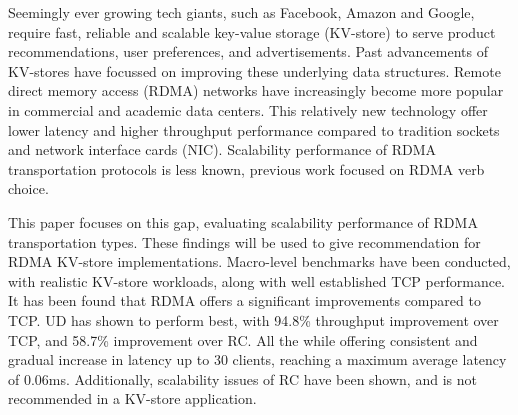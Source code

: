 


\begin{abstracts}        %

    Seemingly ever growing tech giants, such as Facebook, Amazon and Google, require fast, reliable and scalable key-value storage (KV-store) to serve product recommendations, user preferences, and advertisements.
    Past advancements of KV-stores have focussed on improving these underlying data structures.
    Remote direct memory access (RDMA) networks have increasingly become more popular in commercial and academic data centers.
    This relatively new technology offer lower latency and higher throughput performance compared to tradition sockets and network interface cards (NIC).
    Scalability performance of RDMA transportation protocols is less known, previous work focused on RDMA verb choice.

    This paper focuses on this gap, evaluating scalability performance of RDMA transportation types.
    These findings will be used to give recommendation for RDMA KV-store implementations.
    Macro-level benchmarks have been conducted, with realistic KV-store workloads, along with well established TCP performance.
    It has been found that RDMA offers a significant improvements compared to TCP.
    UD has shown to perform best, with 94.8\% throughput improvement over TCP, and 58.7\% improvement over RC.
    All the while offering consistent and gradual increase in latency up to 30 clients, reaching a maximum average latency of 0.06ms.
    Additionally, scalability issues of RC have been shown, and is not recommended in a KV-store application.

\end{abstracts}


